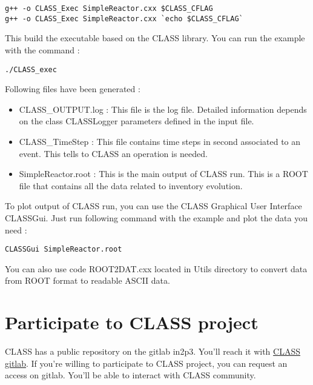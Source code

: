 \begin{center}
\begin{minipage}{\textwidth}
\begin{lstlisting}[style=terminal]
g++ -o CLASS_Exec SimpleReactor.cxx $CLASS_CFLAG
g++ -o CLASS_Exec SimpleReactor.cxx `echo $CLASS_CFLAG`
\end{lstlisting}
\end{minipage}
\end{center}

This build the executable based on the CLASS library. You can run the example with the command : 

\begin{center}
\begin{minipage}{\textwidth}
\begin{lstlisting}[style=terminal]
./CLASS_exec
\end{lstlisting}
\end{minipage}
\end{center}

Following files have been generated : 

\begin{itemize}
  \item CLASS\_OUTPUT.log : This file is the log file. Detailed information depends on the class CLASSLogger parameters defined in the input file. 
  \item CLASS\_TimeStep : This file contains time steps in second associated to an event. This tells to CLASS an operation is needed. 
  \item SimpleReactor.root : This is the main output of CLASS run. This is a ROOT file that contains all the data related to inventory evolution. 
\end{itemize}

To plot output of CLASS run, you can use the CLASS Graphical User Interface CLASSGui. Just run following command with the example and plot the data you need : 

\begin{center}
\begin{minipage}{\textwidth}
\begin{lstlisting}[style=terminal]
CLASSGui SimpleReactor.root
\end{lstlisting}
\end{minipage}
\end{center}

You can also use code ROOT2DAT.cxx located in Utils directory to convert data from ROOT format to readable ASCII data.

\chapter{Participate to CLASS project}

CLASS has a public repository on the gitlab in2p3. You'll reach it with \href{https://gitlab.in2p3.fr/sens/CLASS}{CLASS gitlab}. If you're willing to participate to CLASS project, you can request an access on gitlab. You'll be able to interact with CLASS community.


